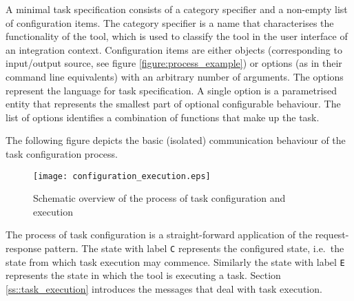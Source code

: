 \documentclass{article}
\begin{document}
   A minimal task specification consists of a category specifier and a
   non-empty list of configuration items. The category specifier is a name that
   characterises the functionality of the tool, which is used to classify the
   tool in the user interface of an integration context. Configuration items
   are either objects (corresponding to input/output source, see figure
   \ref{figure:process_example}) or options (as in their command line
   equivalents) with an arbitrary number of arguments.  The options represent
   the language for task specification. A single option is a parametrised
   entity that represents the smallest part of optional configurable behaviour.
   The list of options identifies a combination of functions that make up the
   task.



   The following figure depicts the basic (isolated) communication behaviour of
   the task configuration process.

   \begin{figure}[H]
    \begin{center}
     \texttt{[image: configuration\_execution.eps]}
    \end{center}
    \vspace{-0.3cm}
    \label{fig:configuration_execution}
    \caption{Schematic overview of the process of task configuration and execution}
   \end{figure}

   \noindent The process of task configuration is a straight-forward application of the
   request-response pattern. The state with label \texttt{C} represents the
   configured state, i.e.\ the state from which task execution may commence.
   Similarly the state with label \texttt{E} represents the state in which the
   tool is executing a task. Section \ref{ss::task_execution} introduces the
   messages that deal with task execution.
\end{document}

